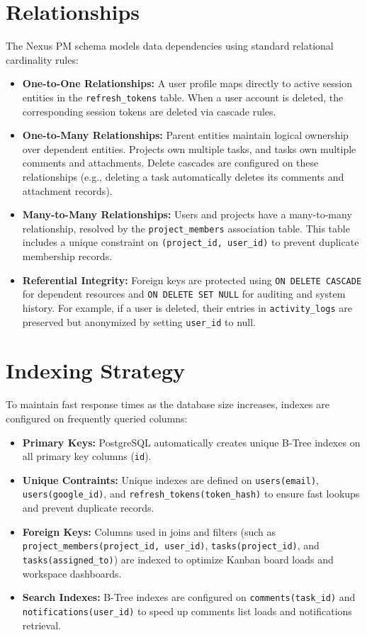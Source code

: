 \pagebreak
\section{Relationships}
The Nexus PM schema models data dependencies using standard relational cardinality rules:
\begin{itemize}
    \item \textbf{One-to-One Relationships:} A user profile maps directly to active session entities in the \texttt{refresh\_tokens} table. When a user account is deleted, the corresponding session tokens are deleted via cascade rules.
    \item \textbf{One-to-Many Relationships:} Parent entities maintain logical ownership over dependent entities. Projects own multiple tasks, and tasks own multiple comments and attachments. Delete cascades are configured on these relationships (e.g., deleting a task automatically deletes its comments and attachment records).
    \item \textbf{Many-to-Many Relationships:} Users and projects have a many-to-many relationship, resolved by the \texttt{project\_members} association table. This table includes a unique constraint on \texttt{(project\_id, user\_id)} to prevent duplicate membership records.
    \item \textbf{Referential Integrity:} Foreign keys are protected using \texttt{ON DELETE CASCADE} for dependent resources and \texttt{ON DELETE SET NULL} for auditing and system history. For example, if a user is deleted, their entries in \texttt{activity\_logs} are preserved but anonymized by setting \texttt{user\_id} to null.
\end{itemize}

\section{Indexing Strategy}
To maintain fast response times as the database size increases, indexes are configured on frequently queried columns:
\begin{itemize}
    \item \textbf{Primary Keys:} PostgreSQL automatically creates unique B-Tree indexes on all primary key columns (\texttt{id}).
    \item \textbf{Unique Contraints:} Unique indexes are defined on \texttt{users(email)}, \texttt{users(google\_id)}, and \texttt{refresh\_tokens(token\_hash)} to ensure fast lookups and prevent duplicate records.
    \item \textbf{Foreign Keys:} Columns used in joins and filters (such as \texttt{project\_members(project\_id, user\_id)}, \texttt{tasks(project\_id)}, and \texttt{tasks(assigned\_to)}) are indexed to optimize Kanban board loads and workspace dashboards.
    \item \textbf{Search Indexes:} B-Tree indexes are configured on \texttt{comments(task\_id)} and \texttt{notifications(user\_id)} to speed up comments list loads and notifications retrieval.
\end{itemize}

